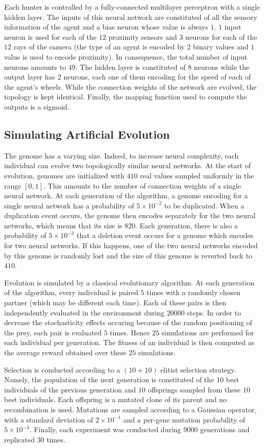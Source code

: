     Each hunter is controlled by a fully-connected multilayer perceptron with a single hidden layer. The inputs of this neural network are constituted of all the sensory information of the agent and a bias neuron whose value is always $1$. $1$ input neuron is used for each of the $12$ proximity sensors and $3$ neurons for each of the $12$ rays of the camera (the type of an agent is encoded by $2$ binary values and $1$ value is used to encode proximity). In consequence, the total number of input neurons amounts to $49$. The hidden layer is constituted of $8$ neurons while the output layer has $2$ neurons, each one of them encoding for the speed of each of the agent's wheels. While the connection weights of the network are evolved, the topology is kept identical. Finally, the mapping function used to compute the outputs is a sigmoid.


  \subsection{Simulating Artificial Evolution}
    The genome has a varying size. Indeed, to increase neural complexity, each individual can evolve two topologically similar neural networks. At the start of evolution, genomes are initialized with $410$ real values sampled uniformly in the range \([0,1]\). This amounts to the number of connection weights of a single neural network. At each generation of the algorithm, a genome encoding for a single neural network has a probability of \(5 \times 10^{-2}\) to be duplicated. When a duplication event occurs, the genome then encodes separately for the two neural networks, which means that its size is $820$. Each generation, there is also a probability of \(5 \times 10^{-3}\) that a deletion event occurs for a genome which encodes for two neural networks. If this happens, one of the two neural networks encoded by this genome is randomly lost and the size of this genome is reverted back to $410$.

    Evolution is simulated by a classical evolutionary algorithm. At each generation of the algorithm, every individual is paired $5$ times with a randomly chosen partner (which may be different each time). Each of these pairs is then independently evaluated in the environment during $20000$ steps. In order to decrease the stochasticity effects occuring because of the random positioning of the prey, each pair is evaluated $5$ times. Hence $25$ simulations are performed for each individual per generation. The fitness of an individual is then computed as the average reward obtained over these $25$ simulations.

    Selection is conducted according to a \((10 + 10)\) elitist selection strategy. Namely, the population of the next generation is constituted of the $10$ best individuals of the previous generation and $10$ offsprings sampled from these $10$ best individuals. Each offspring is a mutated clone of its parent and no recombination is used. Mutations are sampled according to a Gaussian operator, with a standard deviation of \(2 \times 10^{-1}\) and a per-gene mutation probability of \(5 \times 10^{-3}\). Finally, each experiment was conducted during $9000$ generations and replicated $30$ times.

